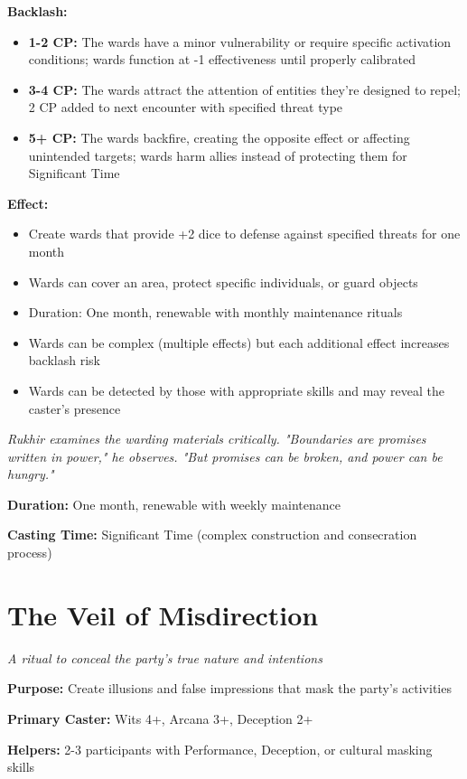 \documentclass[12pt,twoside]{book}
\newcommand{\shadow}[1]{\textit{#1}}
\begin{document}
\textbf{Backlash:}
\begin{itemize}
\item \textbf{1-2 CP:} The wards have a minor vulnerability or require specific activation conditions; wards function at -1 effectiveness until properly calibrated
\item \textbf{3-4 CP:} The wards attract the attention of entities they're designed to repel; 2 CP added to next encounter with specified threat type
\item \textbf{5+ CP:} The wards backfire, creating the opposite effect or affecting unintended targets; wards harm allies instead of protecting them for Significant Time
\end{itemize}

\textbf{Effect:}
\begin{itemize}
\item Create wards that provide +2 dice to defense against specified threats for one month
\item Wards can cover an area, protect specific individuals, or guard objects
\item Duration: One month, renewable with monthly maintenance rituals
\item Wards can be complex (multiple effects) but each additional effect increases backlash risk
\item Wards can be detected by those with appropriate skills and may reveal the caster's presence
\end{itemize}

\shadow{Rukhir examines the warding materials critically. "Boundaries are promises written in power," he observes. "But promises can be broken, and power can be hungry."}

\textbf{Duration:} One month, renewable with weekly maintenance

\textbf{Casting Time:} Significant Time (complex construction and consecration process)

\section*{The Veil of Misdirection}
\textit{A ritual to conceal the party's true nature and intentions}

\textbf{Purpose:} Create illusions and false impressions that mask the party's activities

\textbf{Primary Caster:} Wits 4+, Arcana 3+, Deception 2+

\textbf{Helpers:} 2-3 participants with Performance, Deception, or cultural masking skills
\end{document}
